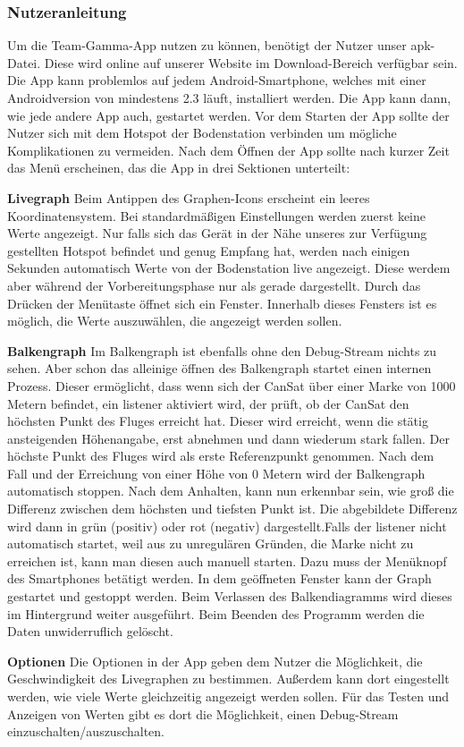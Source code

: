 \subsubsection{Nutzeranleitung}
Um die Team-Gamma-App nutzen zu können, benötigt der Nutzer unser apk-Datei. Diese wird online auf unserer Website im Download-Bereich verfügbar sein. Die App kann problemlos auf jedem Android-Smartphone, welches mit einer Androidversion von mindestens 2.3 läuft, installiert werden. Die App kann dann, wie jede andere App auch, gestartet werden. Vor dem Starten der App sollte der Nutzer sich mit dem Hotspot der Bodenstation verbinden um mögliche Komplikationen zu vermeiden. Nach dem Öffnen der App sollte nach kurzer Zeit das Menü erscheinen, das die App in drei Sektionen unterteilt: 

\begin{description}
	\item \textbf{Livegraph}
	Beim Antippen des Graphen-Icons erscheint ein leeres Koordinatensystem. Bei standardmäßigen Einstellungen werden zuerst keine Werte angezeigt. Nur falls sich das Gerät in der Nähe unseres zur Verfügung gestellten Hotspot befindet und genug Empfang hat, werden nach einigen Sekunden automatisch Werte von der Bodenstation live angezeigt. Diese werdem aber während der Vorbereitungsphase nur als gerade dargestellt. Durch das Drücken der Menütaste öffnet sich ein Fenster. Innerhalb dieses Fensters ist es möglich, die Werte auszuwählen, die angezeigt werden sollen.
	
	\item \textbf{Balkengraph}
	Im Balkengraph ist ebenfalls ohne den Debug-Stream nichts zu sehen. Aber schon das alleinige öffnen des Balkengraph startet einen internen Prozess. Dieser ermöglicht, dass wenn sich der CanSat über einer Marke von 1000 Metern befindet, ein listener aktiviert wird, der prüft, ob der CanSat den höchsten Punkt des Fluges erreicht hat. Dieser wird erreicht, wenn die stätig ansteigenden Höhenangabe, erst abnehmen und dann wiederum stark fallen. Der höchste Punkt des Fluges wird als erste Referenzpunkt genommen. Nach dem Fall und der Erreichung von einer Höhe von 0 Metern wird der Balkengraph automatisch stoppen. Nach dem Anhalten, kann nun erkennbar sein, wie groß die Differenz zwischen dem höchsten und tiefsten Punkt ist. Die abgebildete Differenz wird dann in grün (positiv) oder rot (negativ) dargestellt.Falls der listener nicht automatisch startet, weil aus zu unregulären Gründen, die Marke nicht zu erreichen ist, kann man diesen auch manuell starten. Dazu muss der Menüknopf des Smartphones betätigt werden. In dem geöffneten Fenster kann der Graph gestartet und gestoppt werden. Beim Verlassen des Balkendiagramms wird dieses im Hintergrund weiter ausgeführt. Beim Beenden des Programm werden die Daten unwiderruflich gelöscht.
	
	\item \textbf{Optionen}
	Die Optionen in der App geben dem Nutzer die Möglichkeit, die Geschwindigkeit des Livegraphen zu bestimmen. Außerdem kann dort eingestellt werden, wie viele Werte gleichzeitig angezeigt werden sollen. Für das Testen und Anzeigen von Werten gibt es dort die Möglichkeit, einen Debug-Stream einzuschalten/auszuschalten.
\end{description}